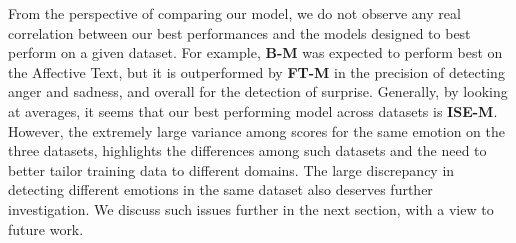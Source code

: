 \documentclass[11pt]{article}
\begin{document}


From the perspective of comparing our model, we do not observe any real correlation between our best performances and the models designed to best perform on a given dataset. For example, \textbf{B-M} was expected to perform best on the Affective Text, but it is outperformed by \textbf{FT-M} in the precision of detecting anger and sadness, and overall for the detection of surprise. Generally, by looking at averages, it seems that our best performing model across datasets is \textbf{ISE-M}. However, the extremely large variance among scores for the same emotion on the three datasets, highlights the differences among such datasets  and the need to better tailor training data to different domains. The large discrepancy in detecting different emotions in the same dataset also deserves further investigation. We discuss such issues further in the next section, with a view to future work.







%
%
%
\end{document}
